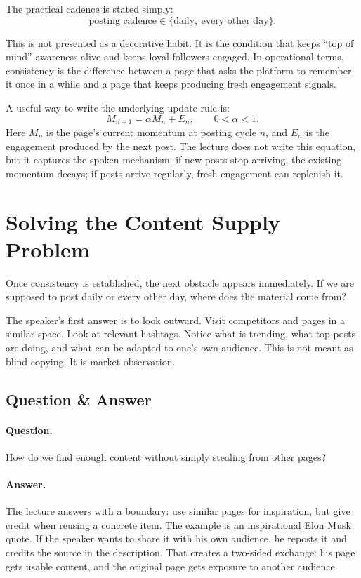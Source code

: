The practical cadence is stated simply:
\begin{equation}
\text{posting cadence} \in
\{\text{daily},\ \text{every other day}\}.
\end{equation}

This is not presented as a decorative habit. It is the condition that keeps ``top of mind'' awareness alive and keeps loyal followers engaged. In operational terms, consistency is the difference between a page that asks the platform to remember it once in a while and a page that keeps producing fresh engagement signals.

A useful way to write the underlying update rule is:
\begin{equation}
M_{n+1}
=
\alpha M_n + E_n,
\qquad 0 < \alpha < 1.
\end{equation}
Here $M_n$ is the page's current momentum at posting cycle $n$, and $E_n$ is the engagement produced by the next post. The lecture does not write this equation, but it captures the spoken mechanism: if new posts stop arriving, the existing momentum decays; if posts arrive regularly, fresh engagement can replenish it.

\section{Solving the Content Supply Problem}

Once consistency is established, the next obstacle appears immediately. If we are supposed to post daily or every other day, where does the material come from?

The speaker's first answer is to look outward. Visit competitors and pages in a similar space. Look at relevant hashtags. Notice what is trending, what top posts are doing, and what can be adapted to one's own audience. This is not meant as blind copying. It is market observation.

\subsection{Question \& Answer}

\paragraph{Question.}
How do we find enough content without simply stealing from other pages?

\paragraph{Answer.}
The lecture answers with a boundary: use similar pages for inspiration, but give credit when reusing a concrete item. The example is an inspirational Elon Musk quote. If the speaker wants to share it with his own audience, he reposts it and credits the source in the description. That creates a two-sided exchange: his page gets usable content, and the original page gets exposure to another audience.

